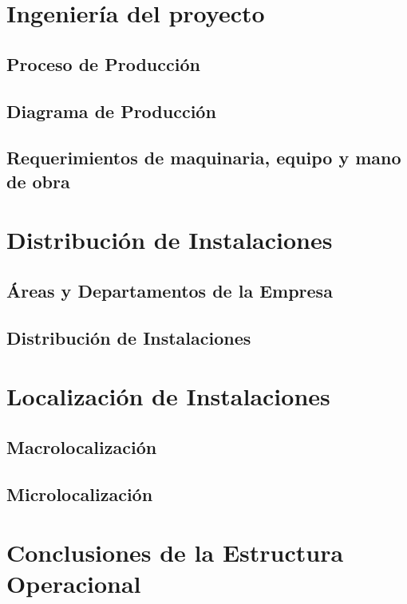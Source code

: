 \section{Ingeniería del proyecto}
	
	\subsection{Proceso de Producción}
	
	\subsection{Diagrama de Producción}
	
	\subsection{Requerimientos de maquinaria, equipo y mano de obra}

\section{Distribución de Instalaciones}

	\subsection{Áreas y Departamentos de la Empresa}
	
	\subsection{Distribución de Instalaciones}

\section{Localización de Instalaciones}

	\subsection{Macrolocalización}
	
	\subsection{Microlocalización}

\section{Conclusiones de la Estructura Operacional}
